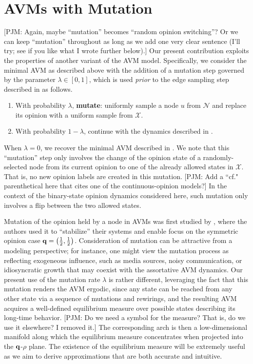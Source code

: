 \documentclass[review, onefignum, onetabnum]{siamart171218}
\newcommand{\pjm}[1]{{\color{blue}[PJM: #1]}}
\begin{document}
\section{AVMs with Mutation}
	\pjm{Again, maybe ``mutation'' becomes ``random opinion switching''? Or we can keep ``mutation'' throughout as long as we add one very clear sentence (I'll try; see if you like what I wrote further below).}
	Our present contribution exploits the properties of another variant of the AVM model. Specifically, we consider the minimal AVM as described above with the addition of a mutation step governed by the parameter $\lambda \in [0,1]$, which is used \emph{prior} to the edge sampling step described in  as follows. 
	\begin{enumerate}
		\item With probability $\lambda$, \textbf{mutate}: uniformly sample a node $u$ from $\mathcal{N}$ and replace its opinion with a uniform sample from $\mathcal{X}$. 
		\item With probability $1-\lambda$, continue with the dynamics described in . 
	\end{enumerate}
	When $\lambda = 0$, we recover the minimal AVM described in . We note that this ``mutation'' step only involves the change of the opinion state of a randomly-selected node from its current opinion to one of the already allowed states in $\mathcal{X}$. That is, no new opinion labels are created in this mutation. \pjm{Add a ``cf." parenthetical here that cites one of the continuous-opinion models?} In the context of the binary-state opinion dynamics considered here, such mutation only involves a flip between the two allowed states.
    
	
	Mutation of the opinion held by a node in AVMs was first studied by \cite{Ji2013}, where the authors used it to ``stabilize'' their systems and enable focus on the symmetric opinion case $\mathbf{q} = \left(\frac{1}{2}, \frac{1}{2}\right)$. 
    Consideration of mutation can be attractive from a modeling perspective; for instance, one might view the mutation process as reflecting exogeneous influence, such as media sources, noisy communication, or idiosyncratic growth that may coexist with the assortative AVM dynamics.  
	Our present use of the mutation rate $\lambda$ is rather different, leveraging the fact that this mutation renders the AVM ergodic, since any state can be reached from any other state via a sequence of mutations and rewirings, and the resulting AVM acquires a well-defined equilibrium measure over possible states describing its long-time behavior. \pjm{Do we need a symbol for the measure? That is, do we use it elsewhere? I removed it.}
	The corresponding arch is then a low-dimensional manifold along which the equilibrium measure concentrates when projected into the $\mathbf{q}$-$\rho$ plane. 
	The existence of the equilibrium measure will be extremely useful as we aim to derive approximations that are both accurate and intuitive. 
	
\end{document}
